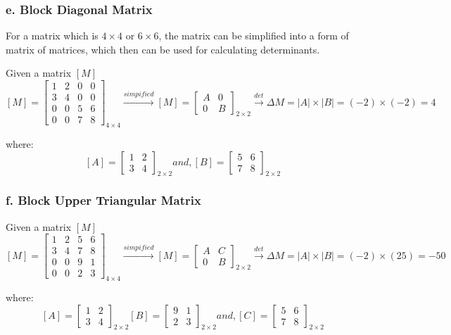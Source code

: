 \subsubsection*{e. Block Diagonal Matrix}

For a matrix which is $4 \times 4$ or $6 \times 6$, the matrix can be simplified into a form of matrix of matrices, which then can be used for calculating determinants.

Given a matrix $[M]$
$$  [M] = \begin{bmatrix}
    1 & 2 & 0 & 0 \\
    3 & 4 & 0 & 0 \\
    0 & 0 & 5 & 6 \\
    0 & 0 & 7 & 8
    \end{bmatrix}_{4 \times 4}
    \xrightarrow{simpified} [M] =  \begin{bmatrix}
    A & 0 \\
    0 & B
    \end{bmatrix}_{2 \times 2}
    \xrightarrow{det} \Delta M = |A| \times |B| = (-2) \times (-2) = 4
$$

where:
$$   [A] =  \begin{bmatrix}
    1 & 2 \\
    3 & 4
    \end{bmatrix}_{2 \times 2} and,
    [B] =  \begin{bmatrix}
    5 & 6 \\
    7 & 8
    \end{bmatrix}_{2 \times 2}
$$

\subsubsection*{f. Block Upper Triangular Matrix}

Given a matrix $[M]$
$$  [M] = \begin{bmatrix}
    1 & 2 & 5 & 6 \\
    3 & 4 & 7 & 8 \\
    0 & 0 & 9 & 1 \\
    0 & 0 & 2 & 3
    \end{bmatrix}_{4 \times 4}
    \xrightarrow{simpified} [M] =  \begin{bmatrix}
    A & C \\
    0 & B
    \end{bmatrix}_{2 \times 2}
    \xrightarrow{det} \Delta M = |A| \times |B| = (-2) \times (25) = -50
$$

where:
$$   [A] =  \begin{bmatrix}
    1 & 2 \\
    3 & 4
    \end{bmatrix}_{2 \times 2}
    [B] =  \begin{bmatrix}
    9 & 1 \\
    2 & 3
    \end{bmatrix}_{2 \times 2} and,
    [C] =  \begin{bmatrix}
    5 & 6 \\
    7 & 8
    \end{bmatrix}_{2 \times 2}
$$

